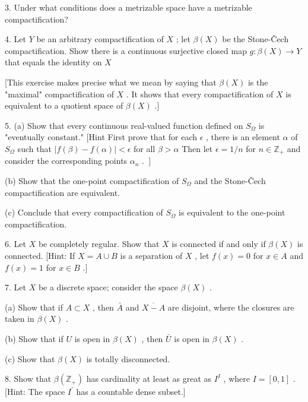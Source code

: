 3. Under what conditions does a metrizable space have a metrizable compactification?

4. Let \(Y\) be an arbitrary compactification of \(X\) ; let \(\beta \left( X\right)\) be the Stone-Čech compactification. Show there is a continuous surjective closed map \(g : \beta \left( X\right)  \rightarrow  Y\) that equals the identity on \(X\)

[This exercise makes precise what we mean by saying that \(\beta \left( X\right)\) is the "maximal" compactification of \(X\) . It shows that every compactification of \(X\) is equivalent to a quotient space of \(\beta \left( X\right)\) .]

5. (a) Show that every continuous real-valued function defined on \({S}_{\Omega }\) is "eventually constant." [Hint First prove that for each \(\epsilon\) , there is an element \(\alpha\) of \({S}_{\Omega }\) such that \(\left| {f\left( \beta \right)  - f\left( \alpha \right) }\right|  < \epsilon\) for all \(\beta  > \alpha\) Then let \(\epsilon  = 1/n\) for \(n \in  {\mathbb{Z}}_{ + }\) and consider the corresponding points \(\left. {{\alpha }_{n}\text{ . }}\right\rbrack\)

(b) Show that the one-point compactification of \({S}_{\Omega }\) and the Stone-Čech compactification are equivalent.

(c) Conclude that every compactification of \({S}_{\Omega }\) is equivalent to the one-point compactification.

6. Let \(X\) be completely regular. Show that \(X\) is connected if and only if \(\beta \left( X\right)\) is connected. [Hint: If \(X = A \cup  B\) is a separation of \(X\) , let \(f\left( x\right)  = 0\) for \(x \in  A\) and \(f\left( x\right)  = 1\) for \(x \in  B\) .]

7. Let \(X\) be a discrete space; consider the space \(\beta \left( X\right)\) .

(a) Show that if \(A \subset  X\) , then \(\bar{A}\) and \(\overline{X - A}\) are disjoint, where the closures are taken in \(\beta \left( X\right)\) .

(b) Show that if \(U\) is open in \(\beta \left( X\right)\) , then \(\bar{U}\) is open in \(\beta \left( X\right)\) .

(c) Show that \(\beta \left( X\right)\) is totally disconnected.

8. Show that \(\beta \left( {\mathbb{Z}}_{ + }\right)\) has cardinality at least as great as \({I}^{I}\) , where \(I = \left\lbrack  {0,1}\right\rbrack\) . [Hint: The space \({I}^{\prime }\) has a countable dense subset.]

